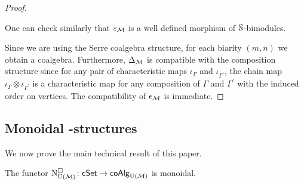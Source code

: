 \begin{proof}
\begin{center}
		\hfill
	\end{center}
	One can check similarly that $\varepsilon_\M$ is a well defined morphism of $\S$-bimodules.

	Since we are using the Serre coalgebra structure, for each biarity $(m,n)$ we obtain a coalgebra.
	Furthermore, $\Delta_\M$ is compatible with the composition structure since for any pair of characteristic maps $\iota_\Gamma$ and $\iota_{\Gamma^\prime}$, the chain map $\iota_\Gamma \otimes \iota_{\Gamma^\prime}$ is a characteristic map for any composition of $\Gamma$ and $\Gamma^\prime$ with the induced order on vertices.
	The compatibility of $\epsilon_\M$ is immediate.
\end{proof}

\subsection{Monoidal \pdfEinfty-structures}

We now prove the main technical result of this paper.

\begin{lemma} \label{l:cubical e-infty chains are monoidal}
	The functor $\cchainsUM \colon \cSet \to \coAlg_\UM$ is monoidal.
\end{lemma}

